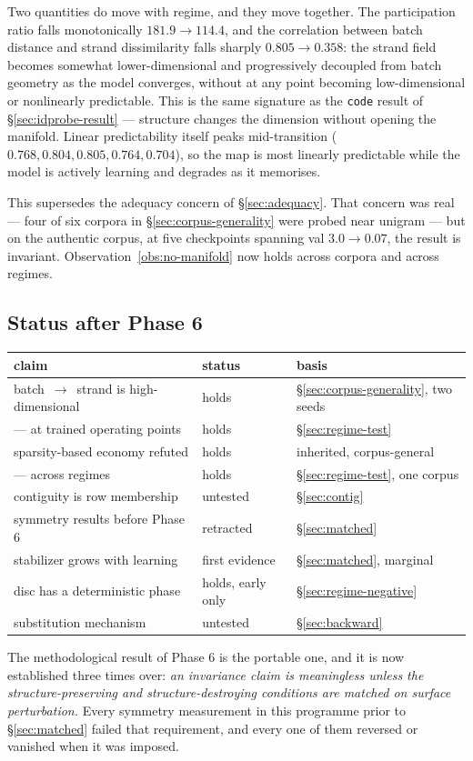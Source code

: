 Two quantities do move with regime, and they move together. The participation
ratio falls monotonically $181.9\to114.4$, and the correlation between batch
distance and strand dissimilarity falls sharply $0.805\to0.358$: the strand
field becomes somewhat lower-dimensional and progressively decoupled from
batch geometry as the model converges, without at any point becoming
low-dimensional or nonlinearly predictable. This is the same signature as the
\texttt{code} result of \S\ref{sec:idprobe-result} --- structure changes the
dimension without opening the manifold. Linear predictability itself peaks
mid-transition ($0.768,0.804,0.805,0.764,0.704$), so the map is most linearly
predictable while the model is actively learning and degrades as it memorises.

This supersedes the adequacy concern of \S\ref{sec:adequacy}. That concern was
real --- four of six corpora in \S\ref{sec:corpus-generality} were probed near
unigram --- but on the authentic corpus, at five checkpoints spanning val
$3.0\to0.07$, the result is invariant. Observation~\ref{obs:no-manifold} now
holds across corpora and across regimes.

\subsection{Status after Phase 6}
\label{sec:phase6-status}

\begin{center}
\begin{tabular}{lll}
\hline
claim & status & basis \\
\hline
batch~$\to$~strand is high-dimensional & holds & \S\ref{sec:corpus-generality}, two seeds \\
\quad --- at trained operating points & holds & \S\ref{sec:regime-test} \\
sparsity-based economy refuted & holds & inherited, corpus-general \\
\quad --- across regimes & holds & \S\ref{sec:regime-test}, one corpus \\
contiguity is row membership & untested & \S\ref{sec:contig} \\
symmetry results before Phase 6 & retracted & \S\ref{sec:matched} \\
stabilizer grows with learning & first evidence & \S\ref{sec:matched}, marginal \\
disc has a deterministic phase & holds, early only & \S\ref{sec:regime-negative} \\
substitution mechanism & untested & \S\ref{sec:backward} \\
\hline
\end{tabular}
\end{center}

The methodological result of Phase 6 is the portable one, and it is now
established three times over: \emph{an invariance claim is meaningless unless
the structure-preserving and structure-destroying conditions are matched on
surface perturbation.} Every symmetry measurement in this programme prior to
\S\ref{sec:matched} failed that requirement, and every one of them reversed or
vanished when it was imposed.
